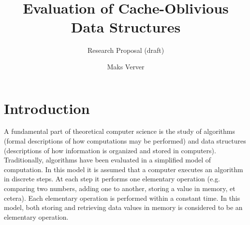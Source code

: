 \documentclass{acm_proc_article-sp}
\begin{document}
\title{Evaluation of Cache-Oblivious Data Structures}
\subtitle{Research Proposal (draft)}

\author{Maks Verver\\ }


\maketitle



\section{Introduction}

A fundamental part of theoretical computer science is the study of algorithms (formal descriptions of how computations may be performed) and data structures (descriptions of how information is organized and stored in computers). Traditionally, algorithms have been evaluated in a simplified model of computation. In this model it is assumed that a computer executes an algorithm in discrete steps. At each step it performs one elementary operation (e.g. comparing two numbers, adding one to another, storing a value in memory, et cetera). Each elementary operation is performed within a constant time. In this model, both storing and retrieving data values in memory is considered to be an elementary operation.
\end{document}

